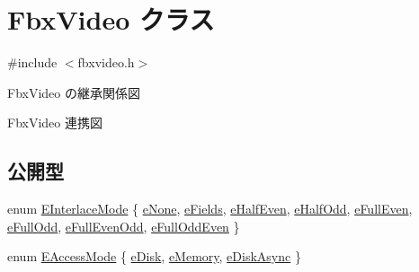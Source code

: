 \hypertarget{class_fbx_video}{}\section{Fbx\+Video クラス}
\label{class_fbx_video}


{\ttfamily \#include $<$fbxvideo.\+h$>$}



Fbx\+Video の継承関係図


Fbx\+Video 連携図
\subsection*{公開型}
\begin{DoxyCompactItemize}
\item 
enum \hyperlink{class_fbx_video_a1e60229c28a15e29289f3f00b23aa215}{E\+Interlace\+Mode} \{ \newline
\hyperlink{class_fbx_video_a1e60229c28a15e29289f3f00b23aa215a704fe60074b80df20b68fedcda6b9b4f}{e\+None}, 
\hyperlink{class_fbx_video_a1e60229c28a15e29289f3f00b23aa215a70210f309a14cf3fe1fdfdec93536f80}{e\+Fields}, 
\hyperlink{class_fbx_video_a1e60229c28a15e29289f3f00b23aa215ad04c4acb98e0446dfc296e2287c56a6f}{e\+Half\+Even}, 
\hyperlink{class_fbx_video_a1e60229c28a15e29289f3f00b23aa215aa3c9bb81d958669eb0d66f481b5b4b57}{e\+Half\+Odd}, 
\newline
\hyperlink{class_fbx_video_a1e60229c28a15e29289f3f00b23aa215aa4207eff0569b05011c820555f206e6e}{e\+Full\+Even}, 
\hyperlink{class_fbx_video_a1e60229c28a15e29289f3f00b23aa215af4f5d62b92c2487787b429965829a70c}{e\+Full\+Odd}, 
\hyperlink{class_fbx_video_a1e60229c28a15e29289f3f00b23aa215a5643f7d85ee0d023d43b0d0feb11ea73}{e\+Full\+Even\+Odd}, 
\hyperlink{class_fbx_video_a1e60229c28a15e29289f3f00b23aa215aa342e3401c45173cdfd733920163340f}{e\+Full\+Odd\+Even}
 \}
\item 
enum \hyperlink{class_fbx_video_a6dd88dabb2170adcd8c58952ed2e0c40}{E\+Access\+Mode} \{ \hyperlink{class_fbx_video_a6dd88dabb2170adcd8c58952ed2e0c40acca51c771e1f539812097982a4e62d80}{e\+Disk}, 
\hyperlink{class_fbx_video_a6dd88dabb2170adcd8c58952ed2e0c40aea3d1fa828ba9d118a2f8da3fd944f41}{e\+Memory}, 
\hyperlink{class_fbx_video_a6dd88dabb2170adcd8c58952ed2e0c40ab7a1eb0357475f15c29683abcc1f16e3}{e\+Disk\+Async}
 \}
\end{DoxyCompactItemize}
